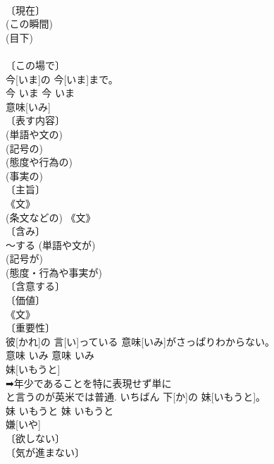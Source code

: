 \documentclass[8pt]{extreport}
\begin{document}
\begin{CJK}{UTF8}{min}
\\	〔現在〕 
\\	(この瞬間) 
\\	(目下) 
\\	[⇒いまごろ 
\\	〔現代〕 
\\	〔当節〕 
\\	〔いましがた〕 
\\	〔さっき〕 
\\	〔直ちに〕 
\\	〔じきに〕 
\\	〔もうすぐ〕 
\\	〔さらに〕 
\\	〔もう〕 
\\	〔別の〕 
\\	[⇒いまひとつ] 
\\	〔この場で〕 
\\	今[いま]の 今[いま]まで。	
\\	今	いま	今	いま	
\\	意味[いみ]	
\\	〔表す内容〕 
\\	(単語や文の) 
\\	(記号の) 
\\	(態度や行為の) 
\\	(事実の) 
\\	〔主旨〕 
\\	《文》 
\\	(条文などの) 《文》 
\\	〔含み〕 
\\	～する (単語や文が) 
\\	(記号が) 
\\	(態度・行為や事実が) 
\\	〔含意する〕 
\\	〔価値〕 
\\	《文》 
\\	〔重要性〕 
\\	彼[かれ]の 言[い]っている 意味[いみ]がさっぱりわからない。	
\\	意味	いみ	意味	いみ	
\\	妹[いもうと]	
\\	➡年少であることを特に表現せず単に 
\\	と言うのが英米では普通.	いちばん 下[か]の 妹[いもうと]。	
\\	妹	いもうと	妹	いもうと	
\\	嫌[いや]	
\\	〔欲しない〕 
\\	〔気が進まない〕 

\end{CJK}
\end{document}
